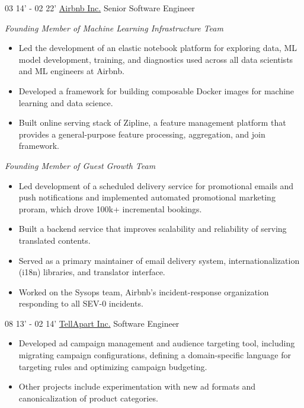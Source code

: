\documentclass[]{patyoon-cv}
\begin{document}
\begin{entrylist}
  \entry
  {03 14' - 02 22'}
  {\href{https://www.airbnb.com/}{Airbnb Inc.}}
  {Senior Software Engineer}
    {\begin{spacing}{0.5} \end{spacing}
      \emph{\small Founding Member of Machine Learning Infrastructure Team}\\
          \begin{itemize}
    \item Led the development of an elastic notebook platform for exploring data, ML model development, training, and diagnostics used across all data scientists and ML engineers at Airbnb.
    \item Developed a framework for building composable Docker images for machine learning and data science.
    \item Built online serving stack of Zipline, a feature management platform that provides a general-purpose feature processing, aggregation, and join framework.
    \end{itemize}
  \begin{spacing}{1.5} \end{spacing}
      \emph{\small Founding Member of Guest Growth Team}\\
    \begin{itemize}
    \item Led development of a scheduled delivery service for promotional emails and push notifications and implemented automated promotional marketing proram, which drove 100k+ incremental bookings.
    \item Built a backend service that improves scalability and reliability of serving translated contents.
    \item Served as a primary maintainer of email delivery system, internationalization (i18n) libraries, and translator interface.
    \item Worked on the Sysops team, Airbnb's incident-response organization responding to all SEV-0 incidents.
    \end{itemize}
  }
  \entry
  {08 13' - 02 14'}
  {\href{https://tellapart.com/}{TellApart Inc.}}
  {Software Engineer}
  {\begin{itemize}
    \item Developed ad campaign management and audience targeting tool, including migrating campaign configurations, defining a domain-specific language for targeting rules and optimizing campaign budgeting.
    \item Other projects include experimentation with new ad formats and canonicalization of product categories.

\end{itemize}}
\end{entrylist}
\end{document}
